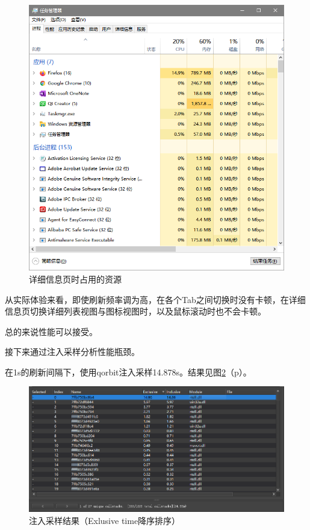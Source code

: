 \documentclass[UTF8,twoside,titlepage]{ctexart}
\newcommand\myref[1]{\ref{#1}（p\pageref{#1}）}
\begin{document}
\begin{figure}[htbp]
    \centering
    \includegraphics[scale=0.75,viewport=0 290 701 356,clip]{../media/performance analyze/load detailtab.png}
    \caption{详细信息页时占用的资源}
    \label{fig:detailanaly}
\end{figure}

从实际体验来看，即使刷新频率调为高，在各个Tab之间切换时没有卡顿，在详细信息页切换详细列表视图与图标视图时，以及鼠标滚动时也不会卡顿。

总的来说性能可以接受。

接下来通过注入采样分析性能瓶颈。

在1s的刷新间隔下，使用qorbit注入采样14.878s。结果见图\myref{fig:qorbit}。

\begin{figure}[H]
    \centering
    \includegraphics[scale=0.6]{../media/performance analyze/14.878s sampling result.png}
    \caption{注入采样结果（Exlusive time降序排序）}
    \label{fig:qorbit}
\end{figure}
\end{document}
